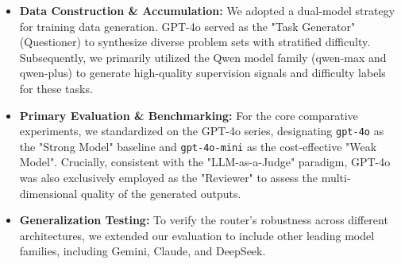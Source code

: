\documentclass{article}
\theoremstyle{plain}
\theoremstyle{definition}
\theoremstyle{remark}
\begin{document}
\begin{itemize} 
    \item \textbf{Data Construction \& Accumulation:} We adopted a dual-model strategy for training data generation. GPT-4o served as the "Task Generator" (Questioner) to synthesize diverse problem sets with stratified difficulty. Subsequently, we primarily utilized the Qwen model family (qwen-max and qwen-plus) to generate high-quality supervision signals and difficulty labels for these tasks.
    
    \item \textbf{Primary Evaluation \& Benchmarking:} For the core comparative experiments, we standardized on the GPT-4o series, designating \texttt{gpt-4o} as the "Strong Model" baseline and \texttt{gpt-4o-mini} as the cost-effective "Weak Model". Crucially, consistent with the "LLM-as-a-Judge" paradigm, GPT-4o was also exclusively employed as the "Reviewer" to assess the multi-dimensional quality of the generated outputs.
    
    \item \textbf{Generalization Testing:} To verify the router's robustness across different architectures, we extended our evaluation to include other leading model families, including Gemini, Claude, and DeepSeek. 
\end{itemize}
\end{document}
